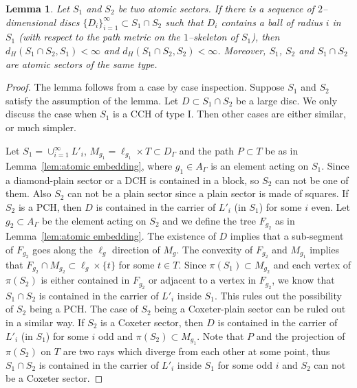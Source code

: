 \documentclass[11pt]{amsart}
\newtheorem{lemma}[theorem]{Lemma}
\theoremstyle{definition}
\begin{document}
\begin{lemma}
	\label{lem:atomic intersection}
Let $S_1$ and $S_2$ be two atomic sectors. If there is a sequence of $2$--dimensional discs $\{D_i\}_{i=1}^{\infty}\subset S_1\cap S_2$ such that $D_i$ contains a ball of radius $i$ in $S_1$ (with respect to the path metric on the $1$--skeleton of $S_1$), then $d_H(S_1\cap S_2,S_1)<\infty$ and $d_H(S_1\cap S_2,S_2)<\infty$. Moreover, $S_1$, $S_2$ and $S_1\cap S_2$ are atomic sectors of the same type.
\end{lemma}

\begin{proof}
The lemma follows from a case by case inspection. Suppose $S_1$ and $S_2$ satisfy the assumption of the lemma. Let $D\subset S_1\cap S_2$ be a large disc. We only discuss the case when $S_1$ is a CCH of type I. Then other cases are either similar, or much simpler. 

Let $S_1=\cup_{i=1}^{\infty}L'_i$, $M_{g_1}=\ell_{g_1}\times T\subset D_\Gamma$ and the path $P\subset T$ be as in Lemma~\ref{lem:atomic embedding}, where $g_1\in A_\Gamma$ is an element acting on $S_1$. Since a diamond-plain sector or a DCH is contained in a block, so $S_2$ can not be one of them. Also $S_2$ can not be a plain sector since a plain sector is made of squares. If $S_2$ is a PCH, then $D$ is contained in the carrier of $L'_i$ (in $S_1$) for some $i$ even. Let $g_2\subset A_\Gamma$ be the element acting on $S_2$ and we define the tree $F_{g_2}$ as in Lemma~\ref{lem:atomic embedding}. The existence of $D$ implies that a sub-segment of $F_{g_2}$ goes along the $\ell_g$ direction of $M_g$. The convexity of $F_{g_2}$ and $M_{g_1}$ implies that $F_{g_2}\cap M_{g_2}\subset \ell_g\times\{t\}$ for some $t\in T$. Since $\pi(S_1)\subset M_{g_2}$ and each vertex of $\pi(S_2)$ is either contained in $F_{g_2}$ or adjacent to a vertex in $F_{g_2}$, we know that $S_1\cap S_2$ is contained in the carrier of $L'_i$ inside $S_1$. This rules out the possibility of $S_2$ being a PCH. The case of $S_2$ being a Coxeter-plain sector can be ruled out in a similar way. If $S_2$ is a Coxeter sector, then $D$ is contained in the carrier of $L'_i$ (in $S_1$) for some $i$ odd and $\pi(S_2)\subset M_{g_1}$. Note that $P$ and the projection of $\pi(S_2)$ on $T$ are two rays which diverge from each other at some point, thus $S_1\cap S_2$ is contained in the carrier of $L'_i$ inside $S_1$ for some odd $i$ and $S_2$ can not be a Coxeter sector.


\end{proof}
\end{document}
